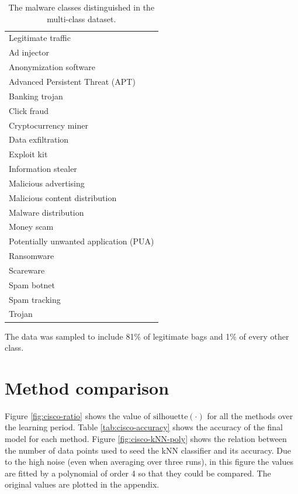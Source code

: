 \begin{table}
  \centering
  \begin{tabular}{l}
    \toprule
    Legitimate traffic \\
    Ad injector \\
    Anonymization software \\
    Advanced Persistent Threat (APT) \\
    Banking trojan \\
    Click fraud \\
    Cryptocurrency miner \\
    Data exfiltration \\
    Exploit kit \\
    Information stealer \\
    Malicious advertising \\
    Malicious content distribution \\
    Malware distribution \\
    Money scam \\
    Potentially unwanted application (PUA) \\
    Ransomware \\
    Scareware \\
    Spam botnet \\
    Spam tracking \\
    Trojan \\
    \bottomrule
  \end{tabular}
  \caption{The malware classes distinguished in the multi-class dataset.}\label{tab:cisco-malware-classes}
\end{table}

The data was sampled to include 81\% of legitimate bags and 1\% of every other class.

\section{Method comparison}

Figure \ref{fig:cisco-ratio} shows the value of \( \mathrm{silhouette} \left( \cdot \right) \) for all the methods over the learning period. Table \ref{tab:cisco-accuracy} shows the accuracy of the final model for each method. Figure \ref{fig:cisco-kNN-poly} shows the relation between the number of data points used to seed the kNN classifier and its accuracy. Due to the high noise (even when averaging over three runs), in this figure the values are fitted by a polynomial of order 4 so that they could be compared. The original values are plotted in the appendix.


